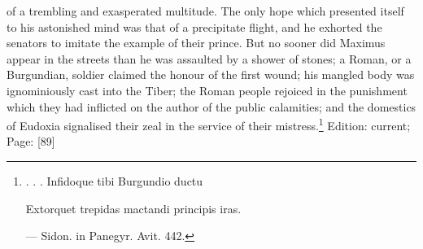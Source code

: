 of a trembling and exasperated multitude. The only hope which presented itself to his astonished mind was that of a precipitate flight, and he exhorted the senators to imitate the example of their prince. But no sooner did Maximus appear in the streets than he was assaulted by a shower of stones; a Roman, or a Burgundian, soldier claimed the honour of the first wound; his mangled body was ignominiously cast into the Tiber; the Roman people rejoiced in the punishment which they had inflicted on the author of the public calamities; and the domestics of Eudoxia signalised their zeal in the service of their mistress.\footnote{. . . Infidoque tibi Burgundio ductu

Extorquet trepidas mactandi principis iras.

\texthebrew{—} Sidon. in Panegyr. Avit. 442.}
Edition: current; Page: [89]

